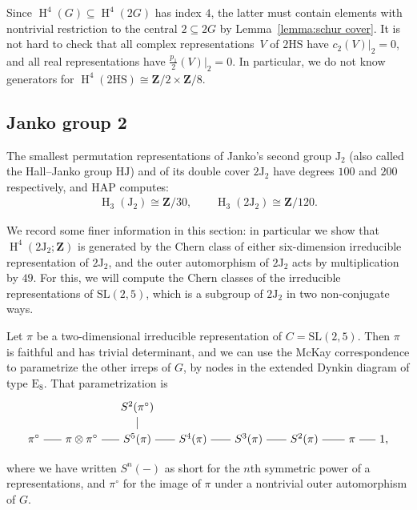 \documentclass[pdftex]{sigma}
\numberwithin{equation}{section}
\newcommand\bZ{\mathbf Z}
\newcommand\rJ{\mathrm J}
\DeclareMathOperator\homology{H}
\renewcommand\H{\homology}
\newcommand\<\langle
\renewcommand\>\rangle
\newcommand{\SL}{\mathrm{SL}}
\begin{document}
Since $\H^4(G) \subseteq \H^4(2G)$ has index $4$, the latter must contain elements with nontrivial restriction to the central $2 \subseteq 2G$ by Lemma~\ref{lemma:schur cover}.
 It is not hard to check that all complex representations~$V$ of $2\mathrm{HS}$ have $c_2(V)|_{2} = 0$, and all real representations have $\frac{p_1}2(V)|_2 = 0$. In particular, we do not know generators for $\H^4(2\mathrm{HS}) \cong \bZ/2 \times \bZ/8$.

\subsection{Janko group 2}\label{sub:J2}

The smallest permutation representations of Janko's second group $\rJ_2$ (also called the Hall--Janko group $\mathrm{HJ}$) and of its double cover $2\rJ_2$ have degrees $100$ and $200$ respectively, and HAP computes:
\begin{gather*} \H_3(\rJ_2) \cong \bZ/30, \qquad \H_3(2\rJ_2) \cong \bZ/120. \end{gather*}

We record some finer information in this section: in particular we show that $\H^4(2\rJ_2;\bZ)$ is generated by the Chern class of either six-dimension irreducible representation of $2\rJ_2$, and the outer automorphism of $2\rJ_2$ acts by multiplication by $49$. For this, we will compute the Chern classes of the irreducible representations of $\SL(2,5)$, which is a subgroup of $2\rJ_2$ in two non-conjugate ways.

Let $\pi$ be a two-dimensional irreducible representation of $C = \SL(2,5)$. Then $\pi$ is faithful and has trivial determinant, and we can use the McKay correspondence to parametrize the other irreps of $G$, by nodes in the extended Dynkin diagram of type $\mathrm{E}_8$. That parametrization is
\begin{gather*}
\begin{tikzpicture}[anchor=base]
 \path
 node (1a) {$1$,}
 ++(-1,0) node (2a) {$\pi$}
 ++(-1.5,0) node (3a) {$S^2(\pi)$}
 ++(-1.75,0) node (4a) {$S^3(\pi)$}
 ++(-1.75,0) node (5a) {$S^4(\pi)$}
 ++(-1.75,0) node (6a) {$S^5(\pi)$}
 +(0,1) node (3b) {$S^2(\pi^\circ)$}
 ++(-1.75,0) node (4b) {$\pi \otimes \pi^\circ$}
 ++(-1.5,0) node (2b) {$\pi^\circ$}
 ;
 \draw (1a.west |- 2a.east) -- (2a.east);
 \draw (2a.west) -- (3a.east |- 2a.west);
 \draw (3a.west |- 2a.west) -- (4a.east |- 2a.west);
 \draw (4a.west |- 2a.west) -- (5a.east |- 2a.west);
 \draw (5a.west |- 2a.west) -- (6a.east |- 2a.west);
 \draw (6a.west |- 2a.west) -- (4b.east |- 2a.west);
 \draw (4b.west |- 2a.west) -- (2b.east |- 2a.west);
 \draw (6a) -- (3b);
\end{tikzpicture}
\end{gather*}
where we have written $S^n(-)$ as short for the $n$th symmetric power of a representations, and $\pi^{\circ}$ for the image of $\pi$ under a nontrivial outer automorphism of $G$.
\end{document}
